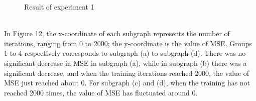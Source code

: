 \documentclass[11pt,a4paper]{article}
\begin{document}
\begin{figure}[ht!]
\centering
{}
\quad
{}
\quad
{}
\quad
{}
\caption{Result of experiment 1}
\label{fig: Result of experiment 1 }
\end{figure}
\\
In Figure 12, the x-coordinate of each subgraph represents the number of iterations, ranging from 0 to 2000; the y-coordinate is the value of MSE. Groups 1 to 4 respectively corresponds to subgraph (a) to subgraph (d). There was no significant decrease in MSE in subgraph (a), while in subgraph (b) there was a significant decrease, and when the training iterations reached 2000, the value of MSE just reached about 0.  For subgraph (c) and (d), when the training has not reached 2000 times, the value of MSE has fluctuated around 0.
\end{document}

